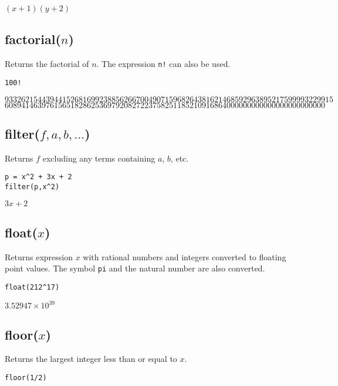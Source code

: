 \noindent
$\displaystyle (x+1)(y+2)$

\subsection*{factorial($n$)}

Returns the factorial of $n$.
The expression {\tt n!} can also be used.

{\color{blue}
\begin{verbatim}
100!
\end{verbatim}
}

\noindent
$93326215443944152681699238856266700490715968264381621468592963895217599993229915$\\
$608941463976156518286253697920827223758251185210916864000000000000000000000000$

\subsection*{filter($f,a,b,\ldots$)}

Returns $f$ excluding any terms containing $a$, $b$, etc.

{\color{blue}
\begin{verbatim}
p = x^2 + 3x + 2
filter(p,x^2)
\end{verbatim}
}

\noindent
$3x+2$

\subsection*{float($x$)}

Returns expression $x$ with rational numbers and integers converted to
floating point values.
The symbol {\tt pi} and the natural number are also converted.

{\color{blue}
\begin{verbatim}
float(212^17)
\end{verbatim}
}

\noindent
$\displaystyle 3.52947\times 10^{39}$

\subsection*{floor($x$)}

Returns the largest integer less than or equal to $x$.

{\color{blue}
\begin{verbatim}
floor(1/2)
\end{verbatim}
}

